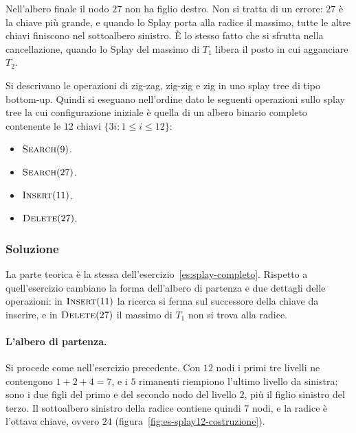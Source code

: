 \begin{osservazione}
Nell'albero finale il nodo $27$ non ha figlio destro. Non si tratta di un errore: $27$ è la chiave più grande, e quando lo Splay porta alla radice il massimo, tutte le altre chiavi finiscono nel sottoalbero sinistro. È lo stesso fatto che si sfrutta nella cancellazione, quando lo Splay del massimo di $T_1$ libera il posto in cui agganciare $T_2$.
\end{osservazione}

\begin{esercizio}\label{es:splay-completo-12}
Si descrivano le operazioni di zig-zag, zig-zig e zig in uno splay tree di tipo bottom-up. Quindi si eseguano nell'ordine dato le seguenti operazioni sullo splay tree la cui configurazione iniziale è quella di un albero binario completo contenente le $12$ chiavi $\{3i : 1 \le i \le 12\}$:
\begin{itemize}
    \item $\textsc{Search}(9)$.
    \item $\textsc{Search}(27)$.
    \item $\textsc{Insert}(11)$.
    \item $\textsc{Delete}(27)$.
\end{itemize}
\end{esercizio}

\subsubsection*{Soluzione}
La parte teorica è la stessa dell'esercizio~\ref{es:splay-completo}. Rispetto a quell'esercizio cambiano la forma dell'albero di partenza e due dettagli delle operazioni: in $\textsc{Insert}(11)$ la ricerca si ferma sul successore della chiave da inserire, e in $\textsc{Delete}(27)$ il massimo di $T_1$ non si trova alla radice.

\paragraph{L'albero di partenza.}
Si procede come nell'esercizio precedente. Con $12$ nodi i primi tre livelli ne contengono $1 + 2 + 4 = 7$, e i $5$ rimanenti riempiono l'ultimo livello da sinistra: sono i due figli del primo e del secondo nodo del livello $2$, più il figlio sinistro del terzo. Il sottoalbero sinistro della radice contiene quindi $7$ nodi, e la radice è l'ottava chiave, ovvero $24$ (figura~\ref{fig:es-splay12-costruzione}).

